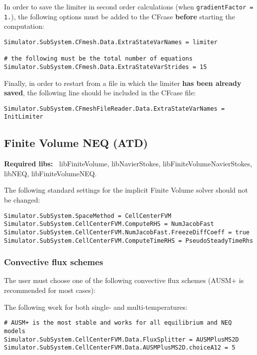 \documentclass[11pt]{article}
\begin{document}
In order to save the limiter in second order calculations (when {\tt gradientFactor = 1.}), the following options must be added to the CFcase {\bf before} 
starting the computation:

\begin{verbatim}
Simulator.SubSystem.CFmesh.Data.ExtraStateVarNames = limiter

# the following must be the total number of equations
Simulator.SubSystem.CFmesh.Data.ExtraStateVarStrides = 15
\end{verbatim}

Finally, in order to restart from a file in which the limiter {\bf has been already saved}, 
the following line should be included in the CFcase file:

\begin{verbatim}
Simulator.SubSystem.CFmeshFileReader.Data.ExtraStateVarNames = InitLimiter
\end{verbatim}

\subsection{Finite Volume NEQ (ATD)}

{\bf Required libs:~} libFiniteVolume, libNavierStokes, libFiniteVolumeNavierStokes, libNEQ,  libFiniteVolumeNEQ. 

The following standard settings for the implicit Finite Volume solver should not be changed:

\begin{verbatim}
Simulator.SubSystem.SpaceMethod = CellCenterFVM
Simulator.SubSystem.CellCenterFVM.ComputeRHS = NumJacobFast
Simulator.SubSystem.CellCenterFVM.NumJacobFast.FreezeDiffCoeff = true
Simulator.SubSystem.CellCenterFVM.ComputeTimeRHS = PseudoSteadyTimeRhs
\end{verbatim}

\subsubsection{Convective flux schemes}

The user must choose one of the following convective flux schemes (AUSM+ is recommended for most cases):

The following work for both single- and multi-temperatures:
\begin{verbatim}
# AUSM+ is the most stable and works for all equilibrium and NEQ models
Simulator.SubSystem.CellCenterFVM.Data.FluxSplitter = AUSMPlusMS2D
Simulator.SubSystem.CellCenterFVM.Data.AUSMPlusMS2D.choiceA12 = 5
\end{verbatim}
\end{document}

